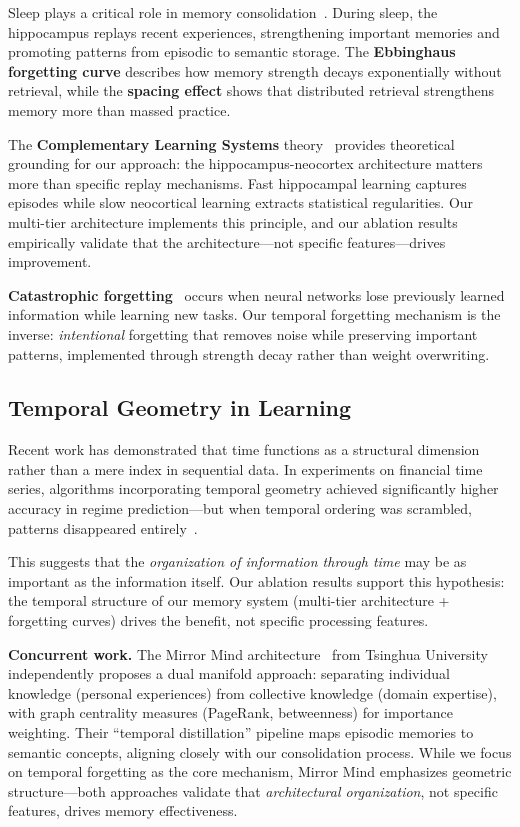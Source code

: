 \documentclass[11pt]{article}
\begin{document}
Sleep plays a critical role in memory consolidation~\citep{walker2009sleep}. During sleep, the hippocampus replays recent experiences, strengthening important memories and promoting patterns from episodic to semantic storage. The \textbf{Ebbinghaus forgetting curve} describes how memory strength decays exponentially without retrieval, while the \textbf{spacing effect} shows that distributed retrieval strengthens memory more than massed practice.

The \textbf{Complementary Learning Systems} theory~\citep{mcclelland1995complementary} provides theoretical grounding for our approach: the hippocampus-neocortex architecture matters more than specific replay mechanisms. Fast hippocampal learning captures episodes while slow neocortical learning extracts statistical regularities. Our multi-tier architecture implements this principle, and our ablation results empirically validate that the architecture---not specific features---drives improvement.

\textbf{Catastrophic forgetting}~\citep{french1999catastrophic,kirkpatrick2017catastrophic} occurs when neural networks lose previously learned information while learning new tasks. Our temporal forgetting mechanism is the inverse: \textit{intentional} forgetting that removes noise while preserving important patterns, implemented through strength decay rather than weight overwriting.

\subsection{Temporal Geometry in Learning}

Recent work has demonstrated that time functions as a structural dimension rather than a mere index in sequential data. In experiments on financial time series, algorithms incorporating temporal geometry achieved significantly higher accuracy in regime prediction---but when temporal ordering was scrambled, patterns disappeared entirely~\citep{temporal_geometry}.

This suggests that the \textit{organization of information through time} may be as important as the information itself. Our ablation results support this hypothesis: the temporal structure of our memory system (multi-tier architecture + forgetting curves) drives the benefit, not specific processing features.

\textbf{Concurrent work.} The Mirror Mind architecture~\citep{mirror_mind2025} from Tsinghua University independently proposes a dual manifold approach: separating individual knowledge (personal experiences) from collective knowledge (domain expertise), with graph centrality measures (PageRank, betweenness) for importance weighting. Their ``temporal distillation'' pipeline maps episodic memories to semantic concepts, aligning closely with our consolidation process. While we focus on temporal forgetting as the core mechanism, Mirror Mind emphasizes geometric structure---both approaches validate that \textit{architectural organization}, not specific features, drives memory effectiveness.
\end{document}
